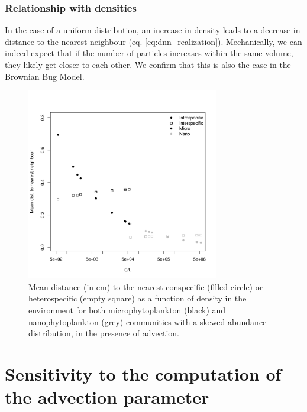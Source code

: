 \documentclass[english]{article}
\begin{document}
\subsubsection*{Relationship with densities}

In the case of a uniform distribution, an increase in density leads
to a decrease in distance to the nearest neighbour (eq. \ref{eq:dnn_realization}).
Mechanically, we can indeed expect that if the number of particles
increases within the same volume, they likely get closer to each other.
We confirm that this is also the case in the Brownian Bug Model. 

\begin{figure}[H]
\begin{centering}
\includegraphics[width=0.75\textwidth]{../code/figure/dist_abundances_10sp_v2}
\par\end{centering}
\caption{Mean distance (in cm) to the nearest conspecific (filled circle) or
heterospecific (empty square) as a function of density in the environment
for both microphytoplankton (black) and nanophytoplankton (grey) communities
with a skewed abundance distribution, in the presence of advection.\label{fig:Distance_abundance}}
\end{figure}


\section{Sensitivity to the computation of the advection parameter}
\end{document}
